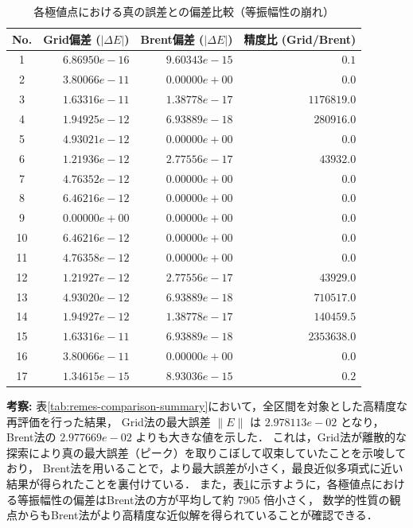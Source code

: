 \begin{table}[H]
 \centering
 \caption{各極値点における真の誤差との偏差比較（等振幅性の崩れ）}
 \label{tab:remes-comparison-detail}
 \begin{tabular}{crrr}
 \toprule
 No. & Grid偏差 ($|\Delta E|$) & Brent偏差 ($|\Delta E|$) & 精度比 (Grid/Brent) \\
 \midrule
 1 & $6.86950e-16$ & $9.60343e-15$ & $0.1$ \\
 2 & $3.80066e-11$ & $0.00000e+00$ & $0.0$ \\
 3 & $1.63316e-11$ & $1.38778e-17$ & $1176819.0$ \\
 4 & $1.94925e-12$ & $6.93889e-18$ & $280916.0$ \\
 5 & $4.93021e-12$ & $0.00000e+00$ & $0.0$ \\
 6 & $1.21936e-12$ & $2.77556e-17$ & $43932.0$ \\
 7 & $4.76352e-12$ & $0.00000e+00$ & $0.0$ \\
 8 & $6.46216e-12$ & $0.00000e+00$ & $0.0$ \\
 9 & $0.00000e+00$ & $0.00000e+00$ & $0.0$ \\
 10 & $6.46216e-12$ & $0.00000e+00$ & $0.0$ \\
 11 & $4.76358e-12$ & $0.00000e+00$ & $0.0$ \\
 12 & $1.21927e-12$ & $2.77556e-17$ & $43929.0$ \\
 13 & $4.93020e-12$ & $6.93889e-18$ & $710517.0$ \\
 14 & $1.94927e-12$ & $1.38778e-17$ & $140459.5$ \\
 15 & $1.63316e-11$ & $6.93889e-18$ & $2353638.0$ \\
 16 & $3.80066e-11$ & $0.00000e+00$ & $0.0$ \\
 17 & $1.34615e-15$ & $8.93036e-15$ & $0.2$ \\
 \bottomrule
 \end{tabular}
\end{table}

\noindent\textbf{考察:}
表\ref{tab:remes-comparison-summary}において，全区間を対象とした高精度な再評価を行った結果，
Grid法の最大誤差 $\|E\|$ は $2.978113e-02$ となり，Brent法の $2.977669e-02$ よりも大きな値を示した．
これは，Grid法が離散的な探索により真の最大誤差（ピーク）を取りこぼして収束していたことを示唆しており，
Brent法を用いることで，より最大誤差が小さく，最良近似多項式に近い結果が得られたことを裏付けている．
また，表\ref{tab:remes-comparison-detail}に示すように，各極値点における等振幅性の偏差はBrent法の方が平均して約 7905 倍小さく，
数学的性質の観点からもBrent法がより高精度な近似解を得られていることが確認できる．
